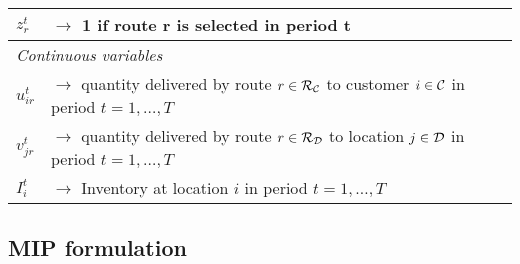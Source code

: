 \documentclass[10pt, a4paper]{article}
\begin{document}
\begin{table}
\begin{tabular}{ll}
        $z^t_r$ & $\rightarrow$ 1 if route r is selected in period t\\
        \hline
        \multicolumn{2}{l}{\textit{Continuous variables}}\\
        $u^t_{ir}$ & $\rightarrow$ quantity delivered by route $r\in\mathcal{R_C}$ to customer $i\in\mathcal{C}$ in period $t=1,\ldots,T$\\
        $v^t_{jr}$ & $\rightarrow$ quantity delivered by route $r\in\mathcal{R_D}$ to location $j\in\mathcal{D}$ in period $t=1,\ldots,T$\\
        $I^t_i$ & $\rightarrow$ Inventory at location $i$ in period $t=1,\ldots,T$\\
        \hline
    \end{tabular}
\end{table}

\subsection{MIP formulation}\label{subsection:MIP}
\end{document}
